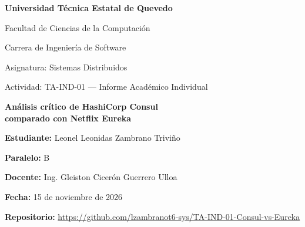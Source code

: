 \documentclass[12pt,a4paper]{article}
\begin{document}
\begin{titlepage}
  \centering
  {\Large\bfseries Universidad Técnica Estatal de Quevedo\par}
  \vspace{0.3cm}
  {\large Facultad de Ciencias de la Computación\par}
  \vspace{0.2cm}
  {\large Carrera de Ingeniería de Software\par}
  \vspace{1.5cm}
  {\large Asignatura: Sistemas Distribuidos\par}
  \vspace{0.3cm}
  {\large Actividad: TA-IND-01 --- Informe Académico Individual\par}
  \vspace{2cm}
  {\LARGE\bfseries Análisis crítico de HashiCorp Consul\\[0.2cm] comparado con Netflix Eureka\par}
  \vspace{2cm}
  {\large \textbf{Estudiante:} Leonel Leonidas Zambrano Triviño\par}
  \vspace{0.3cm}
  {\large \textbf{Paralelo:} B\par}
  \vspace{0.3cm}
  {\large \textbf{Docente:} Ing. Gleiston Cicerón Guerrero Ulloa\par}
  \vspace{0.3cm}
  {\large \textbf{Fecha:} 15 de noviembre de 2026\par}
  \vfill
  {\small \textbf{Repositorio:} \url{https://github.com/lzambranot6-sys/TA-IND-01-Consul-vs-Eureka}\par}
\end{titlepage}

\begin{abstract}
En este informe se analiza HashiCorp Consul, un sistema de descubrimiento de servicios (\textit{service discovery}) usado en arquitecturas de microservicios, y se compara con Netflix Eureka, que resuelve el mismo problema con un enfoque diferente. El análisis aplica los conceptos de la Unidad 1: transparencias de distribución, teorema CAP y su extensión PACELC, modelos de comunicación y tolerancia a fallos. Para respaldar el análisis se levantó un clúster local de tres servidores de Consul con Docker y se realizaron dos experimentos: la caída del nodo líder y la pérdida del quórum. En el primero, el clúster eligió un nuevo líder mediante Raft y el nodo caído se reincorporó y se puso al día sin intervención manual. En el segundo, con un solo servidor activo, Consul rechazó las escrituras y las lecturas normales, y solo respondió a las lecturas en modo \textit{stale}. Esto confirma que Consul prioriza la consistencia ante una partición (CP), mientras que Eureka prioriza la disponibilidad (AP). Se concluye que Consul es adecuado cuando la exactitud del registro es crítica, pero su consenso limita la escalabilidad y lo vuelve indisponible si se pierde la mayoría.
\end{abstract}
\end{document}
